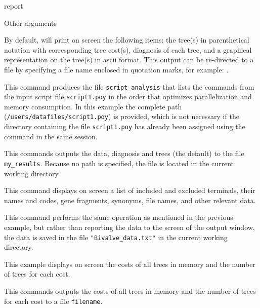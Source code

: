 \begin{command}{report}{}
\begin{arguments}
\begin{argumentgroup}{Other arguments}
	     \end{argumentgroup}
	\end{arguments}

        {By default, \poy will print on screen the following items: the tree(s)
        in parenthetical notation with corresponding tree cost(s), diagnosis of
        each tree, and a graphical representation on the tree(s) in ascii
        format. This output can be re-directed to a file by specifying a file
        name enclosed in quotation marks, for example:
        .}

	\begin{poyexamples} 

          {This command produces the file \texttt{script\_analysis} that lists the commands from
          the input script file \texttt{script1.poy} in the order that optimizes parallelization and
          memory consumption. In this example the complete path (\texttt{/users/datafiles/script1.poy})
          is provided, which is not necessary if the directory containing the file \texttt{script1.poy}
          has already been assigned using the command  in the same \poy session.}
          
		{This commands outputs the data, diagnosis and trees (the default) to the
		file \texttt{my\_results}. Because no path is specified, the
		file is located in the current working directory.}
		
            {This command displays on screen a list of included and excluded terminals, their
            names and codes, gene fragments, synonyms, file names, and other relevant data.}
            
            {This command performs the same operation as mentioned in the previous example,
            but rather than reporting the data to the screen of the output window, the data
            is saved in the file \texttt{"Bivalve\_data.txt"} in the current working directory.}
            
            {This example displays on screen the costs of all trees in memory and the
            number of trees for each cost.}

            {This commands outputs the costs of all trees in memory and the
            number of trees for each cost to a file \texttt{filename}.}
		

\end{poyexamples}
\end{command}
